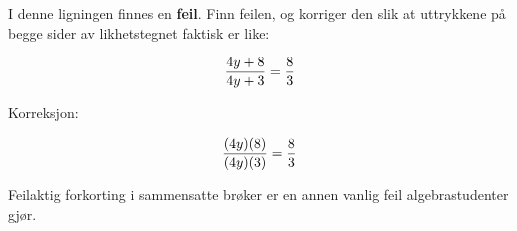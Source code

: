 

I denne ligningen finnes en {\bf feil}. Finn feilen, og korriger den slik at uttrykkene på begge sider av likhetstegnet faktisk er like:

$${{4y + 8} \over {4y + 3}} = {8 \over 3}$$







Korreksjon:

$${{(4y)(8)} \over {(4y)(3)}} = {8 \over 3}$$







Feilaktig forkorting i sammensatte brøker er en annen vanlig feil algebrastudenter gjør.



